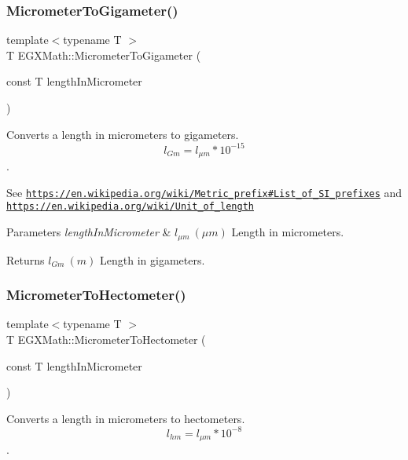 \subsubsection{\texorpdfstring{Micrometer\+To\+Gigameter()}{MicrometerToGigameter()}}
{\footnotesize\ttfamily template$<$typename T $>$ \\
T E\+G\+X\+Math\+::\+Micrometer\+To\+Gigameter (\begin{DoxyParamCaption}\item[{const T}]{length\+In\+Micrometer }\end{DoxyParamCaption})}



Converts a length in micrometers to gigameters. \[ l_{Gm}=l_{\mu m} * 10^{-15} \]. 

See \href{https://en.wikipedia.org/wiki/Metric_prefix#List_of_SI_prefixes}{\tt https\+://en.\+wikipedia.\+org/wiki/\+Metric\+\_\+prefix\#\+List\+\_\+of\+\_\+\+S\+I\+\_\+prefixes} and \href{https://en.wikipedia.org/wiki/Unit_of_length}{\tt https\+://en.\+wikipedia.\+org/wiki/\+Unit\+\_\+of\+\_\+length} 
\begin{DoxyParams}{Parameters}
{\em length\+In\+Micrometer} & $ l_{\mu m}\ (\mu m)$ Length in micrometers. \\
\hline
\end{DoxyParams}
\begin{DoxyReturn}{Returns}
$ l_{Gm}\ (m)$ Length in gigameters. 
\end{DoxyReturn}
\mbox{\label{group___e_g_x_math-_conversions-_length_conversions-_micrometer-_s_i_ga49b0782446259c1f19927b5ecaff2f12}} 
\subsubsection{\texorpdfstring{Micrometer\+To\+Hectometer()}{MicrometerToHectometer()}}
{\footnotesize\ttfamily template$<$typename T $>$ \\
T E\+G\+X\+Math\+::\+Micrometer\+To\+Hectometer (\begin{DoxyParamCaption}\item[{const T}]{length\+In\+Micrometer }\end{DoxyParamCaption})}



Converts a length in micrometers to hectometers. \[ l_{hm}=l_{\mu m} * 10^{-8} \]. 

